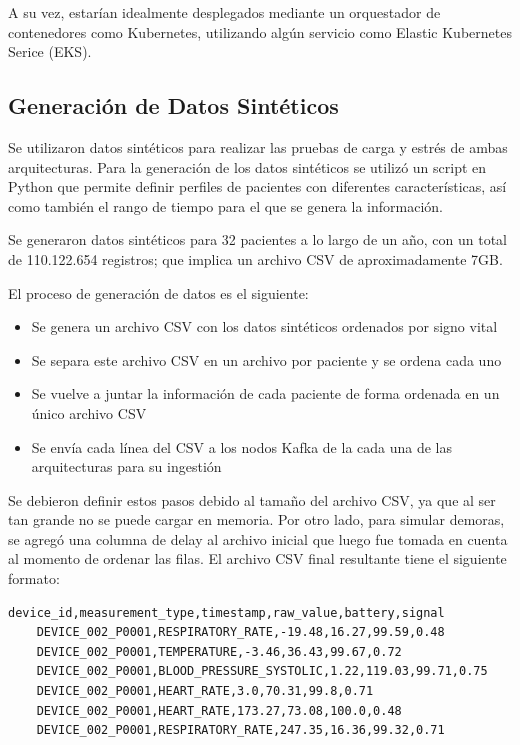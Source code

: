 A su vez, estarían idealmente desplegados mediante un orquestador de contenedores como Kubernetes, utilizando algún servicio como Elastic Kubernetes Serice (EKS).

\newpage

\subsection{Generación de Datos Sintéticos}

Se utilizaron datos sintéticos para realizar las pruebas de carga y estrés de ambas arquitecturas.
Para la generación de los datos sintéticos se utilizó un script en Python que permite definir perfiles de pacientes con diferentes características,
así como también el rango de tiempo para el que se genera la información.\newline

Se generaron datos sintéticos para 32 pacientes a lo largo de un año, con un total de 110.122.654 registros;
que implica un archivo CSV de aproximadamente 7GB.

El proceso de generación de datos es el siguiente:
\begin{itemize}
    \item Se genera un archivo CSV con los datos sintéticos ordenados por signo vital
    \item Se separa este archivo CSV en un archivo por paciente y se ordena cada uno
    \item Se vuelve a juntar la información de cada paciente de forma ordenada en un único archivo CSV
    \item Se envía cada línea del CSV a los nodos Kafka de la cada una de las arquitecturas para su ingestión
\end{itemize}


Se debieron definir estos pasos debido al tamaño del archivo CSV, ya que al ser tan grande no se puede cargar en memoria.
Por otro lado, para simular demoras, se agregó una columna de delay al archivo inicial que luego fue tomada en cuenta al momento de ordenar las filas. 
El archivo CSV final resultante tiene el siguiente formato:
\begin{lstlisting}[language=CSV]
    device_id,measurement_type,timestamp,raw_value,battery,signal
    DEVICE_002_P0001,RESPIRATORY_RATE,-19.48,16.27,99.59,0.48
    DEVICE_002_P0001,TEMPERATURE,-3.46,36.43,99.67,0.72
    DEVICE_002_P0001,BLOOD_PRESSURE_SYSTOLIC,1.22,119.03,99.71,0.75
    DEVICE_002_P0001,HEART_RATE,3.0,70.31,99.8,0.71
    DEVICE_002_P0001,HEART_RATE,173.27,73.08,100.0,0.48
    DEVICE_002_P0001,RESPIRATORY_RATE,247.35,16.36,99.32,0.71
\end{lstlisting}


